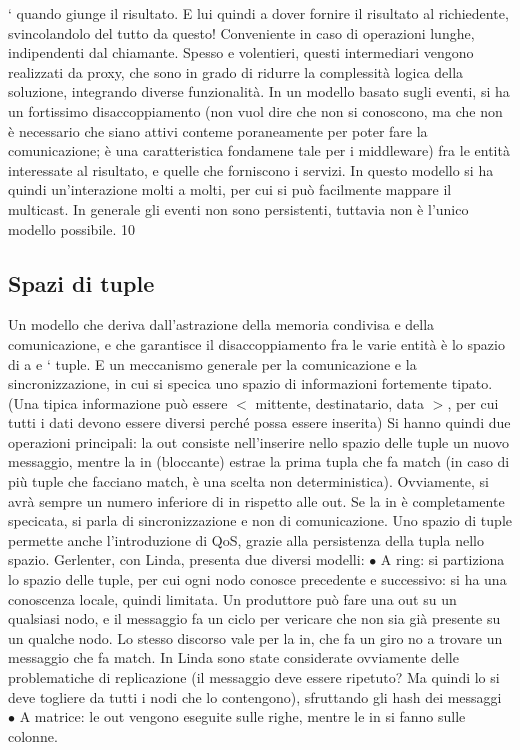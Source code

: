 `
quando giunge il risultato. E lui quindi a dover fornire il risultato al
richiedente, svincolandolo del tutto da questo! Conveniente in caso di
operazioni lunghe, indipendenti dal chiamante.
Spesso e volentieri, questi intermediari vengono realizzati da proxy, che sono in
grado di ridurre la complessità logica della soluzione, integrando diverse funzionalità.
In un modello basato sugli eventi, si ha un fortissimo disaccoppiamento (non
vuol dire che non si conoscono, ma che non è necessario che siano attivi conteme
poraneamente per poter fare la comunicazione; è una caratteristica fondamene
tale per i middleware) fra le entità interessate al risultato, e quelle che forniscono
i servizi. In questo modello si ha quindi un'interazione molti a molti, per cui si
può facilmente mappare il multicast. In generale gli eventi non sono persistenti,
tuttavia non è l'unico modello possibile.
10
\subsection{Spazi di tuple}
Un modello che deriva dall'astrazione della memoria condivisa e della comunicazione, e che garantisce il
disaccoppiamento fra le varie entità è lo spazio di
a e
`
tuple. E un meccanismo generale per la comunicazione e la sincronizzazione, in
cui si specica uno spazio di informazioni fortemente tipato. (Una tipica informazione può essere $<$ mittente,
destinatario, data $>$, per cui tutti i dati devono
essere diversi perché possa essere inserita)
Si hanno quindi due operazioni principali: la out consiste nell'inserire nello
spazio delle tuple un nuovo messaggio, mentre la in (bloccante) estrae la prima
tupla che fa match (in caso di più tuple che facciano match, è una scelta non
deterministica). Ovviamente, si avrà sempre un numero inferiore di in rispetto
alle out. Se la in è completamente specicata, si parla di sincronizzazione e non
di comunicazione. Uno spazio di tuple permette anche l'introduzione di QoS,
grazie alla persistenza della tupla nello spazio.
Gerlenter, con Linda, presenta due diversi modelli:
$\bullet$ A ring: si partiziona lo spazio delle tuple, per cui ogni nodo conosce
precedente e successivo: si ha una conoscenza locale, quindi limitata. Un
produttore può fare una out su un qualsiasi nodo, e il messaggio fa un
ciclo per vericare che non sia già presente su un qualche nodo. Lo stesso
discorso vale per la in, che fa un giro no a trovare un messaggio che fa
match. In Linda sono state considerate ovviamente delle problematiche
di replicazione (il messaggio deve essere ripetuto? Ma quindi lo si deve
togliere da tutti i nodi che lo contengono), sfruttando gli hash dei messaggi
$\bullet$ A matrice: le out vengono eseguite sulle righe, mentre le in si fanno sulle
colonne.
